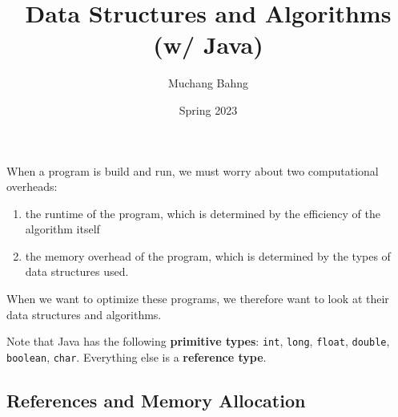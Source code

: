 \documentclass{article}
\theoremstyle{definition}
\theoremstyle{remark}
\theoremstyle{definition}
\begin{document}
\pagestyle{fancy}

\cfoot{\thepage / \pageref{LastPage}}

\title{Data Structures and Algorithms (w/ Java)}
\author{Muchang Bahng}
\date{Spring 2023}

\maketitle

\noindent When a program is build and run, we must worry about two computational overheads: 
\begin{enumerate}
    \item the runtime of the program, which is determined by the efficiency of the algorithm itself 
    \item the memory overhead of the program, which is determined by the types of data structures used. 
\end{enumerate}
When we want to optimize these programs, we therefore want to look at their data structures and algorithms. 

Note that Java has the following \textbf{primitive types}: \texttt{int}, \texttt{long}, \texttt{float}, \texttt{double}, \texttt{boolean}, \texttt{char}. Everything else is a \textbf{reference type}. 

\subsection{References and Memory Allocation}
\end{document}
